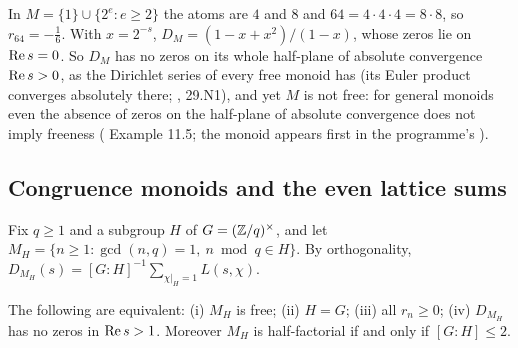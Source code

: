 \begin{example}\label{ex:foureight}
In $M=\{1\}\cup\{2^e:e\ge2\}$ the atoms are $4$ and $8$ and $64=4\cdot4\cdot4=8\cdot8$, so $r_{64}=-\tfrac16$. With $x=2^{-s}$, $D_M=(1-x+x^2)/(1-x)$, whose zeros lie on $\operatorname{Re} s=0$. So $D_M$ has no zeros on its whole half-plane of absolute convergence $\operatorname{Re} s>0$, as the Dirichlet series of every free monoid has (its Euler product converges absolutely there; ,  29.N1), and yet $M$ is not free: for general monoids even the absence of zeros on the half-plane of absolute convergence does not imply freeness ( Example 11.5; the monoid appears first in the programme's ).
\end{example}

\subsection{Congruence monoids and the even lattice sums}

Fix $q\ge1$ and a subgroup $H$ of $G=(\mathbb{Z}/q)^\times$, and let $M_H=\{n\ge1:\gcd(n,q)=1,\ n\bmod q\in H\}$. By orthogonality, $D_{M_H}(s)=[G:H]^{-1}\sum_{\chi|_H=1}L(s,\chi)$.

\begin{proposition}\label{prop:congruence}
The following are equivalent: (i) $M_H$ is free; (ii) $H=G$; (iii) all $r_n\ge0$; (iv) $D_{M_H}$ has no zeros in $\operatorname{Re} s>1$.
Moreover $M_H$ is half-factorial if and only if $[G:H]\le2$.
\end{proposition}

